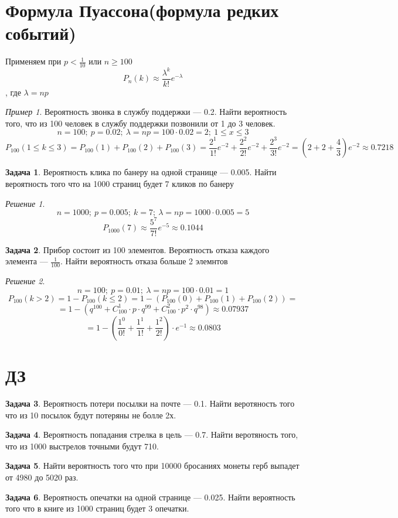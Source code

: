 \documentclass[english]{article}
\theoremstyle{plain}
\theoremstyle{remark}
\newtheorem*{solution}{Решение}
\newtheorem*{examp}{Пример}
\theoremstyle{definition}
\newtheorem{task}{Задача}
\begin{document}
\section{Формула Пуассона(формула редких событий)}
\label{sec:org8007e3b}
Применяем при \(p < \frac{1}{10}\) или \(n \ge 100\)
\[ P_n(k) \approx \frac{\lambda^k}{k!}e^{-\lambda} \], где \(\lambda = np\)
\begin{examp}
Вероятность звонка в службу поддержки --- 0.2.  Найти вероятность
того, что из 100 человек в службу поддержки позвонили от 1 до 3
человек.
\[ n= 100;\ p = 0.02;\ \lambda = np = 100\cdot0.02 = 2;\ 1 \le x \le 3 \]
\[ P_{100}(1 \le k \le 3) = P_{100}(1) + P_{100}(2) + P_{100}(3) = \frac{2^1}{1!}e^{-2} + \frac{2^2}{2!}e^{-2} + \frac{2^3}{3!}e^{-2} = (2 + 2 + \frac{4}{3})e^{-2} \approx 0.7218 \]
\end{examp}
\begin{task}
Вероятность клика по банеру на одной странице --- 0.005. Найти
вероятность того что на 1000 страниц будет 7 кликов по банеру
\end{task}
\begin{solution}
\[ n = 1000;\ p = 0.005;\ k = 7;\ \lambda = np = 1000\cdot 0.005 = 5 \]
\[ P_{1000}(7) \approx \frac{5^7}{7!}e^{-5} \approx 0.1044 \]
\end{solution}
\begin{task}
Прибор состоит из 100 элементов. Вероятность отказа каждого элемента
--- \(\frac{1}{100}\). Найти вероятность отказа больше 2 элемнтов
\end{task}
\begin{solution}
\[ n = 100;\ p = 0.01;\ \lambda = np = 100\cdot0.01 = 1 \]
\[ P_{100}(k > 2) = 1 - P_{100}(k \le 2) = 1 - (P_{100}(0) + P_{100}(1) + P_{100}(2)) = \]
\[ = 1 - (q^{100} + C^1_{100}\cdot p \cdot q^{99} + C^2_{100}\cdot p^2 \cdot q^{98}) \approx 0.07937 \]
\[ = 1 - \left(\frac{1^0}{0!} + \frac{1^1}{1!} + \frac{1^2}{2!}\right)\cdot e^{-1} \approx 0.0803 \]
\end{solution}
\section{ДЗ}
\label{sec:orgf151f57}
\begin{task}
Вероятность потери посылки на почте --- 0.1. Найти веротяность того
что из 10 посылок будут потеряны не болле 2х.
\end{task}
\begin{task}
Вероятность попадания стрелка в цель --- 0.7. Найти веротяность того,
что из 1000 выстрелов точными будут 710.
\end{task}
\begin{task}
Найти вероятность того что при 10000 бросаниях монеты герб выпадет от 4980 до 5020 раз.
\end{task}
\begin{task}
Вероятность опечатки на одной странице --- 0.025. Найти вероятность
того что в книге из 1000 страниц будет 3 опечатки.
\end{task}
\end{document}
